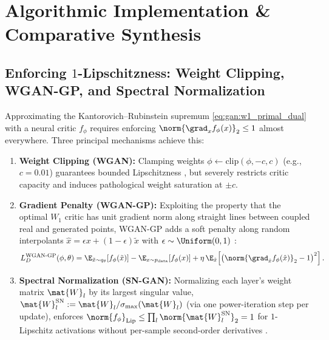 \documentclass[../../../../master.tex]{subfiles}
\begin{document}
\section{Algorithmic Implementation \& Comparative Synthesis}
\label{sec:gan:algorithms}

\subsection{Enforcing $1$-Lipschitzness: Weight Clipping, WGAN-GP, and Spectral Normalization}

Approximating the Kantorovich--Rubinstein supremum \eqref{eq:gan:w1_primal_dual} with a neural critic $f_\phi$ requires enforcing $\norm{\grad_x f_\phi(x)}_2 \le 1$ almost everywhere. Three principal mechanisms achieve this:
\begin{enumerate}
  \item \textbf{Weight Clipping (WGAN):} Clamping weights $\phi \leftarrow \mathrm{clip}(\phi, -c, c)$ (e.g., $c = 0.01$) guarantees bounded Lipschitzness , but severely restricts critic capacity and induces pathological weight saturation at $\pm c$.
  \item \textbf{Gradient Penalty (WGAN-GP):} Exploiting the property that the optimal $W_1$ critic has unit gradient norm along straight lines between coupled real and generated points, WGAN-GP adds a soft penalty along random interpolants $\hat{x} = \epsilon x + (1-\epsilon)\tilde{x}$ with $\epsilon \sim \Uniform(0,1)$  :
  \begin{equation}
    \label{eq:gan:wgan_gp_loss}
    L_D^{\mathrm{WGAN\text{-}GP}}(\phi, \theta)
    = \E_{\tilde{x} \sim q_\theta}[f_\phi(\tilde{x})] - \E_{x \sim p_{\mathrm{data}}}[f_\phi(x)]
    + \eta\,\E_{\hat{x}}\!\left[\left(\norm{\grad_{\hat{x}} f_\phi(\hat{x})}_2 - 1\right)^2\right].
  \end{equation}
  \item \textbf{Spectral Normalization (SN-GAN):} Normalizing each layer's weight matrix $\mat{W}_l$ by its largest singular value, $\mat{W}_l^{\mathrm{SN}} := \mat{W}_l / \sigma_{\max}(\mat{W}_l)$ (via one power-iteration step per update), enforces $\norm{f_\phi}_{\mathrm{Lip}} \le \prod_l \norm{\mat{W}_l^{\mathrm{SN}}}_2 = 1$ for $1$-Lipschitz activations without per-sample second-order derivatives .
\end{enumerate}
\end{document}
